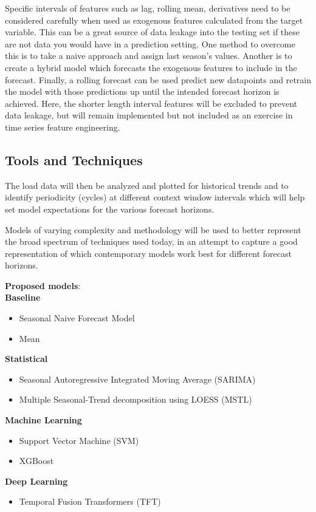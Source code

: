 \documentclass[sigconf]{acmart}
\begin{document}
Specific intervals of features such as lag, rolling mean, derivatives need to be considered carefully when used as exogenous features calculated from the target variable. This can be a great source of data leakage into the testing set if these are not data you would have in a prediction setting. One method to overcome this is to take a naive approach and assign last season's values. Another is to create a hybrid model which forecasts the exogenous features to include in the forecast. Finally, a rolling forecast can be used predict new datapoints and retrain the model with those predictions up until the intended forecast horizon is achieved. Here, the shorter length interval features will be excluded to prevent data leakage, but will remain implemented but not included as an exercise in time series feature engineering.

  \subsection{Tools and Techniques}
    The load data will then be analyzed and plotted for historical trends and to identify periodicity (cycles) at different context window intervals which will help set model expectations for the various forecast horizons. 
    
    Models of varying complexity and methodology will be used to better represent the broad spectrum of techniques used today, in an attempt to capture a good representation of which contemporary models work best for different forecast horizons. 

\textbf{Proposed models}:
\\
\textbf{Baseline}
\begin{itemize}
    \item{Seasonal Naive Forecast Model}
    \item{Mean}
\end{itemize}
\textbf{Statistical}
\begin{itemize}
    \item{Seasonal Autoregressive Integrated Moving Average (SARIMA)}
    \item{Multiple Seasonal-Trend decomposition using LOESS (MSTL)}
\end{itemize}
\textbf{Machine Learning}
\begin{itemize}
    \item{Support Vector Machine (SVM)}
    \item{XGBoost}
\end{itemize}
\textbf{Deep Learning}
\begin{itemize}
    \item{Temporal Fusion Transformers (TFT)}
\end{itemize}
\end{document}
